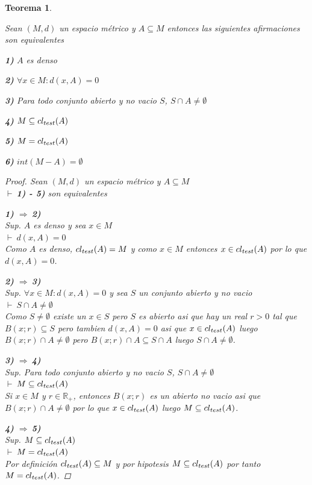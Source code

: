 \documentclass[oneside]{book} %
\theoremstyle{Teorema}
\newtheorem{Teorema}[Definicion]{Teorema}
\theoremstyle{Ejemplos}
\theoremstyle{[Obs]}
\def \test {test}
\newcommand{\cerradura}[2][\test]{\ifx \test #1 {\overline{#2}} \else {cl_{#1}(#2)} \fi} %
\renewcommand{\{}{\left\lbrace} %
\renewcommand{\}}{\right\rbrace} %
\newcommand{\n}{\cap} %
\renewcommand{\sc}{\subseteq} %
\newcommand{\R}{\mathbb{R}} %
\newcommand{\pd}{$\vdash\ $} %
\newcommand{\Imp}{$\Rightarrow\ $} %
\begin{document}
			\begin{Teorema}\label{Teorema: Equivalencias de densos}\setlength{\parindent}{0em}
				
				Sean $(M, d)$ un espacio métrico y $A \sc M$ entonces las siguientes afirmaciones son equivalentes 

				\textbf{1)} $A$ es denso 

				\textbf{2)} $\forall x \in M : d(x, A) = 0$ 

				\textbf{3)} Para todo conjunto abierto y no vacio $S$, $S \n A \neq \emptyset$

				\textbf{4)} $M \sc \cerradura{A}$

				\textbf{5)} $M = \cerradura{A}$

				\textbf{6)} $int(M - A) = \emptyset$

				\begin{proof}
					
					Sean $(M, d)$ un espacio métrico y $A \sc M$ \\ 
					\pd \textbf{1) - 5)} son equivalentes 

					\textbf{1)} \Imp \textbf{2)} \\ 
					Sup. $A$ es denso y sea $x \in M$ \\ 
					\pd $d(x, A) = 0$ \\ 
					Como $A$ es denso, $\cerradura{A} = M$ y como $x \in M$ entonces $x \in \cerradura{A}$ por lo que $d(x, A) = 0$.

					\textbf{2)} \Imp \textbf{3)} \\ 
					Sup. $\forall x \in M : d(x, A) = 0$ y sea $S$ un conjunto abierto y no vacio \\ 
					\pd $S \n A \neq \emptyset$ \\ 
					Como $S \neq \emptyset$ existe un $x \in S$ pero $S$ es abierto asi que hay un real $r > 0$ tal que $B(x;r) \sc S$ pero tambien $d(x, A) = 0$ asi que $x \in \cerradura{A}$ luego $B(x;r) \n A \neq \emptyset$ pero $B(x;r) \n A \sc S \n A$ luego $S \n A \neq \emptyset$.

					\textbf{3)} \Imp \textbf{4)} \\ 
					Sup. Para todo conjunto abierto y no vacio $S$, $S \n A \neq \emptyset$ \\ 
					\pd $M \sc \cerradura{A}$ \\ 
					Si $x \in M$ y $r \in \R_{+}$, entonces $B(x;r)$ es un abierto no vacio asi que $B(x;r) \n A \neq \emptyset$ por lo que $x \in \cerradura{A}$ luego $M \sc \cerradura{A}$.

					\textbf{4)} \Imp \textbf{5)} \\ 
					Sup. $M \sc \cerradura{A}$ \\ 
					\pd $M = \cerradura{A}$ \\ 
					Por definición $\cerradura{A} \sc M$ y por hipotesis $M \sc \cerradura{A}$ por tanto $M = \cerradura{A}$.


\end{proof}
\end{Teorema}
\end{document}
